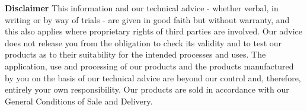 \documentclass{article}
\begin{document}
\vspace*{\fill}
\footnotesize{
	\textbf{Disclaimer} This information and our technical advice - whether verbal, in writing or by way of trials - are given in good faith but without warranty, and this also applies
	where proprietary rights of third parties are involved. Our advice does not release you from the obligation to check its validity and to test our products as to their
	suitability for the intended processes and uses. The application, use and processing of our products and the products manufactured by you on the basis of our technical
	advice are beyond our control and, therefore, entirely your own responsibility. Our products are sold in accordance with our General Conditions of Sale and Delivery.
}
\end{document}
